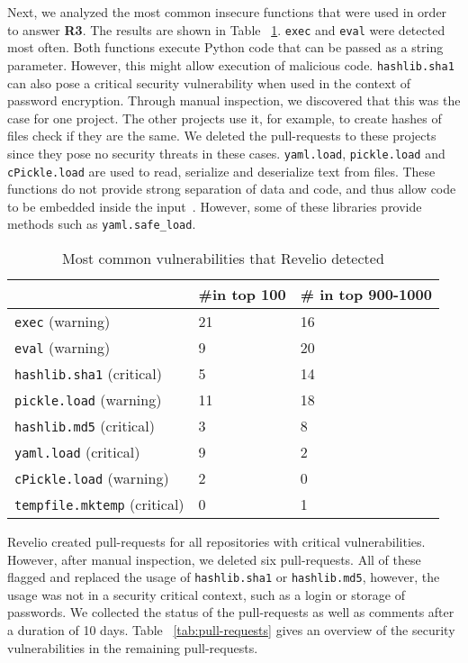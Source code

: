 Next, we analyzed the most common insecure functions that were used in order to answer \textbf{R3}. The results are shown in Table ~\ref{tab:vulnerabilities}. \texttt{exec} and \texttt{eval} were detected most often. Both functions execute Python code that can be passed as a string parameter. However, this might allow execution of malicious code. \texttt{hashlib.sha1} can also pose a critical security vulnerability when used in the context of password encryption. Through manual inspection, we discovered that this was the case for one project. The other projects use it, for example, to create hashes of files check if they are the same. We deleted the pull-requests to these projects since they pose no security threats in these cases. \texttt{yaml.load}, \texttt{pickle.load} and \texttt{cPickle.load} are used to read, serialize and deserialize text from files. These functions do not provide strong separation of data and code, and thus allow code to be embedded inside the input~\cite{openstack}. However, some of these libraries provide methods such as \texttt{yaml.safe\_load}. 


\begin{table}[!h]
\small
  \centering
  \begin{tabular}{|p{}|p{}|p{}|}
    \hline
 & \#in top 100 & \# in top 900-1000 \\
\hline
\hline
\texttt{exec} (warning) & 21 & 16 \\
\hline
\texttt{eval} (warning) & 9 & 20 \\
\hline
\texttt{hashlib.sha1} (critical) & 5 & 14 \\
\hline
\texttt{pickle.load} (warning) & 11 & 18 \\
\hline
\texttt{hashlib.md5} (critical) & 3 & 8 \\
\hline
\texttt{yaml.load} (critical) & 9 & 2 \\
\hline
\texttt{cPickle.load} (warning) & 2 & 0 \\
\hline
\texttt{tempfile.mktemp} (critical) & 0 & 1 \\
 \hline
  \end{tabular}
  \caption{Most common vulnerabilities that Revelio detected} 
  \label{tab:vulnerabilities}
\end{table}

Revelio created pull-requests for all repositories with critical vulnerabilities. However, after manual inspection, we deleted six pull-requests. All of these flagged and replaced the usage of \texttt{hashlib.sha1} or \texttt{hashlib.md5}, however, the usage was not in a security critical context, such as a login or storage of passwords. We collected the status of the pull-requests as well as comments after a duration of 10 days. Table ~\ref{tab:pull-requests} gives an overview of the security vulnerabilities in the remaining pull-requests.


